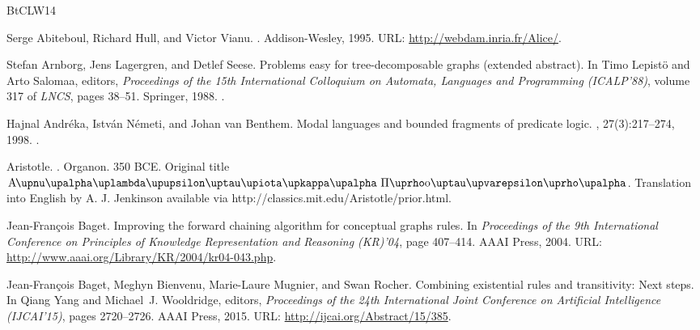 \documentclass[10pt,a4paper]{amsart}
\theoremstyle{definition}
\numberwithin{equation}{section}
\theoremstyle{plain}
\theoremstyle{definition}
\theoremstyle{myexample}
\theoremstyle{plain}
\theoremstyle{definition}
\begin{document}
\newcommand{\etalchar}[1]{$^{#1}$}
\begin{thebibliography}{BtCLW14}

Serge Abiteboul, Richard Hull, and Victor Vianu.
.
\newblock Addison-Wesley, 1995.
\newblock URL: \url{http://webdam.inria.fr/Alice/}.

Stefan Arnborg, Jens Lagergren, and Detlef Seese.
\newblock Problems easy for tree-decomposable graphs (extended abstract).
\newblock In Timo Lepist{\"{o}} and Arto Salomaa, editors, {\em Proceedings of
  the 15th International Colloquium on Automata, Languages and Programming
  ({ICALP}'88)}, volume 317 of {\em LNCS}, pages 38--51. Springer, 1988.
\newblock \href {https://doi.org/10.1007/3-540-19488-6_105}
  {}.

Hajnal Andr{\'{e}}ka, Istv{\'{a}}n N{\'{e}}meti, and Johan van Benthem.
\newblock Modal languages and bounded fragments of predicate logic.
, 27(3):217--274, 1998.
\newblock \href {https://doi.org/10.1023/A:1004275029985}
  {}.

Aristotle.
.
\newblock Organon. 350 BCE.
\newblock Original title
  $\mathrm{A}\hspace{-1pt}\upnu\upalpha\uplambda\upupsilon\uptau\upiota\upkappa\upalpha\
  \Pi\uprho \mathrm{o}\uptau\upvarepsilon\uprho\upalpha$. Translation into
  English by A. J. Jenkinson available via
  http://classics.mit.edu/Aristotle/prior.html.

Jean-Fran\c{c}ois Baget.
\newblock Improving the forward chaining algorithm for conceptual graphs rules.
\newblock In {\em Proceedings of the 9th International Conference on Principles
  of Knowledge Representation and Reasoning ({KR})'04}, page 407–414. AAAI
  Press, 2004.
\newblock URL: \url{http://www.aaai.org/Library/KR/2004/kr04-043.php}.

Jean-Fran{\c{c}}ois Baget, Meghyn Bienvenu, Marie-Laure Mugnier, and Swan
  Rocher.
\newblock Combining existential rules and transitivity: Next steps.
\newblock In Qiang Yang and Michael~J. Wooldridge, editors, {\em Proceedings of
  the 24th International Joint Conference on Artificial Intelligence
  (IJCAI'15)}, pages 2720--2726. {AAAI} Press, 2015.
\newblock URL: \url{http://ijcai.org/Abstract/15/385}.


\end{thebibliography}
\end{document}
